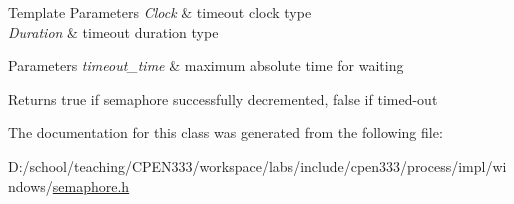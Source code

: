 \begin{DoxyTemplParams}{Template Parameters}
{\em Clock} & timeout clock type \\
\hline
{\em Duration} & timeout duration type \\
\hline
\end{DoxyTemplParams}

\begin{DoxyParams}{Parameters}
{\em timeout\+\_\+time} & maximum absolute time for waiting \\
\hline
\end{DoxyParams}
\begin{DoxyReturn}{Returns}
true if semaphore successfully decremented, false if timed-\/out 
\end{DoxyReturn}


The documentation for this class was generated from the following file\+:\begin{DoxyCompactItemize}
\item 
D\+:/school/teaching/\+C\+P\+E\+N333/workspace/labs/include/cpen333/process/impl/windows/\hyperlink{process_2impl_2windows_2semaphore_8h}{semaphore.\+h}\end{DoxyCompactItemize}
